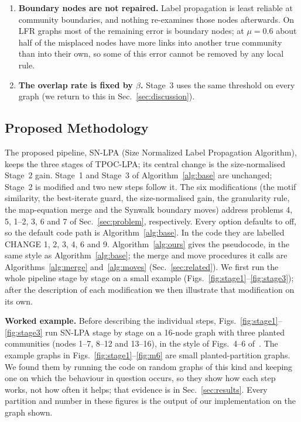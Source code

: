 \documentclass[conference]{IEEEtran}
\begin{document}
\begin{enumerate}
\item \textbf{Boundary nodes are not repaired.} Label propagation is least reliable at community boundaries, and nothing re-examines those nodes afterwards. On LFR graphs most of the remaining error is boundary nodes; at $\mu=0.6$ about half of the misplaced nodes have more links into another true community than into their own, so some of this error cannot be removed by any local rule.
\item \textbf{The overlap rate is fixed by $\beta$.} Stage~3 uses the same threshold on every graph (we return to this in Sec.~\ref{sec:discussion}).
\end{enumerate}

\subsection{Proposed Methodology}\label{sec:arch}
The proposed pipeline, SN-LPA (Size Normalized Label Propagation Algorithm), keeps the three stages of TPOC-LPA; its central change is the size-normalised Stage~2 gain. Stage~1 and Stage~3 of Algorithm~\ref{alg:base} are unchanged; Stage~2 is modified and two new steps follow it. The six modifications (the motif similarity, the best-iterate guard, the size-normalised gain, the granularity rule, the map-equation merge and the Synwalk boundary moves) address problems 4, 5, 1--2, 3, 6 and 7 of Sec.~\ref{sec:problem}, respectively. Every option defaults to off, so the default code path is Algorithm~\ref{alg:base}. In the code they are labelled CHANGE 1, 2, 3, 4, 6 and 9. Algorithm~\ref{alg:ours} gives the pseudocode, in the same style as Algorithm~\ref{alg:base}; the merge and move procedures it calls are Algorithms~\ref{alg:merge} and~\ref{alg:moves} (Sec.~\ref{sec:related}). We first run the whole pipeline stage by stage on a small example (Figs.~\ref{fig:stage1}--\ref{fig:stage3}); after the description of each modification we then illustrate that modification on its own.


\textbf{Worked example.} Before describing the individual steps, Figs.~\ref{fig:stage1}--\ref{fig:stage3} run SN-LPA stage by stage on a 16-node graph with three planted communities (nodes 1--7, 8--12 and 13--16), in the style of Figs.~4--6 of~\cite{kong2026}. The example graphs in Figs.~\ref{fig:stage1}--\ref{fig:m6} are small planted-partition graphs. We found them by running the code on random graphs of this kind and keeping one on which the behaviour in question occurs, so they show how each step works, not how often it helps; that evidence is in Sec.~\ref{sec:results}. Every partition and number in these figures is the output of our implementation on the graph shown.
\end{document}
